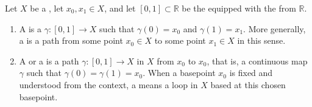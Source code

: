 \begin{definition} \label{definition:path_and_loop_in_a_topological_space}
Let $X$ be a , let $x_0,x_1 \in X$, and let $[0,1] \subset \mathbb{R}$ be the  equipped with the  from $\mathbb{R}$.
\begin{enumerate}
    \item A  is a  $\gamma : [0,1] \to X$ such that $\gamma(0) = x_0$ and $\gamma(1) = x_1$.
    More generally, a  is a path from some point $x_0 \in X$ to some point $x_1 \in X$ in this sense.

    \item A  or a  is a path $\gamma : [0,1] \to X$ in $X$ from $x_0$ to $x_0$, that is, a continuous map $\gamma$ such that $\gamma(0) = \gamma(1) = x_0$.
    When a basepoint $x_0$ is fixed and understood from the context, a  means a loop in $X$ based at this chosen basepoint.
\end{enumerate}
\end{definition}